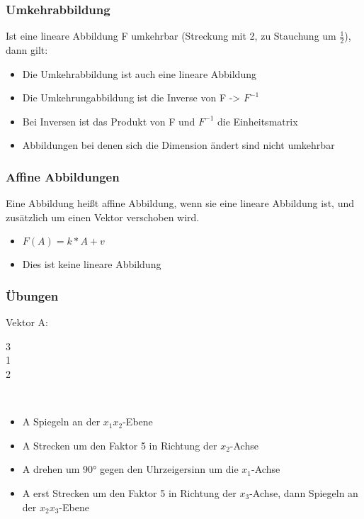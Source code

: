 \begin{frame}
	\frametitle{Umkehrabbildung}
	Ist eine lineare Abbildung F umkehrbar (Streckung mit 2, zu Stauchung um $\frac{1}{2}$), dann gilt:
	\begin{itemize}
		\item Die Umkehrabbildung ist auch eine lineare Abbildung
		\item Die Umkehrungabbildung ist die Inverse von F -> $F^{-1}$
		\item Bei Inversen ist das Produkt von F und $F^{-1}$ die Einheitsmatrix
		\item Abbildungen bei denen sich die Dimension ändert sind nicht umkehrbar
	\end{itemize}
\end{frame}

\begin{frame}
	\frametitle{Affine Abbildungen}
	Eine Abbildung heißt affine Abbildung, wenn sie eine lineare Abbildung ist, und zusätzlich um einen Vektor verschoben wird.
	\begin{itemize}
		\item $F(A) = k*A + v$
		\item Dies ist keine lineare Abbildung
	\end{itemize}
\end{frame}

\begin{frame}
	\frametitle{Übungen}
	Vektor A: \begin{pmatrix}
		3 \\
		1 \\
		2
	\end{pmatrix} \\
	\begin{itemize}
		\item A Spiegeln an der $x_{1}x_{2}$-Ebene
		\item A Strecken um den Faktor 5 in Richtung der $x_{2}$-Achse
		\item A drehen um 90° gegen den Uhrzeigersinn um die $x_{1}$-Achse
		\item A erst Strecken um den Faktor 5 in Richtung der $x_{3}$-Achse, dann Spiegeln an der $x_{2}x_{3}$-Ebene
	\end{itemize}
\end{frame}

